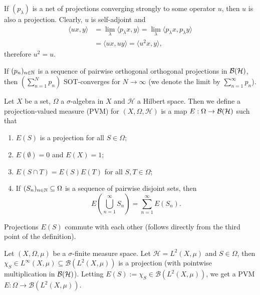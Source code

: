 \begin{remark}
  If $(p_\lambda)$ is a net of projections converging strongly to some operator $u$, then $u$ is also a projection.
  Clearly, $u$ is self-adjoint and 
  \begin{align*}
    \langle ux, y \rangle &= \lim_{\lambda} \langle p_\lambda x, y\rangle = \lim_{\lambda} \langle p_\lambda x, p_\lambda y \rangle\\
    &= \langle ux, uy\rangle = \langle u^2 x, y\rangle,
  \end{align*}
  therefore $u^2 = u$.
\end{remark}

\begin{corollary}
  If $(p_n)_{n \in \mathbb {N}}$ is a sequence of pairwise orthogonal orthogonal projections in $\operatorname{\mathcal{B} (\mathcal{H})}$,
  then $\left(\sum_{n = 1} ^N p_n\right)$ SOT-converges for $N \to \infty$ (we denote the limit by $\sum_{n = 1} ^\infty p_n$). 
\end{corollary}

\begin{definition}
  Let $X$ be a set, $\Omega$ a $\sigma$-algebra in $X$ and $\mathcal{H}$ a Hilbert space.
  Then we define a projection-valued measure (PVM) for $(X, \Omega, \mathcal{H})$ is a map 
  $E: \Omega \to \operatorname{\mathcal{B} (\mathcal{H})}$ such that 
  \begin{enumerate}
    \item $E(S)$ is a projection for all $S \in \Omega$;
    \item $E(\emptyset) = 0$ and $E(X) = 1$;
    \item $E(S \cap T) = E(S) E(T)$ for all $S, T \in \Omega$;
    \item If $(S_n)_{n \in \mathbb {N}} \subseteq \Omega$ is a sequence of pairwise disjoint sets, then 
    $$E (\bigcup_{n = 1} ^\infty S_n) = \sum_{n = 1} ^\infty E(S_n).$$
  \end{enumerate}
\end{definition}

\begin{remark}
  Projections $E (S)$ commute with each other (follows directly from the third point of the definition).
\end{remark}

\begin{example}
  Let $(X, \Omega, \mu)$ be a $\sigma$-finite measure space.
  Let $\mathcal{H} = L^2 (X, \mu)$ and $S \in \Omega$, then 
  $\chi_S \in L^\infty (X, \mu) \subseteq \mathcal{B} (L^2 (X, \mu))$ is a projection (with pointwise multiplication in $\operatorname{\mathcal{B} (\mathcal{H})}$).
  Letting $E(S) := \chi_S \in \mathcal{B} (L^2 (X, \mu))$, we get a PVM $E: \Omega \to \mathcal{B}(L^2 (X, \mu))$.
\end{example}

